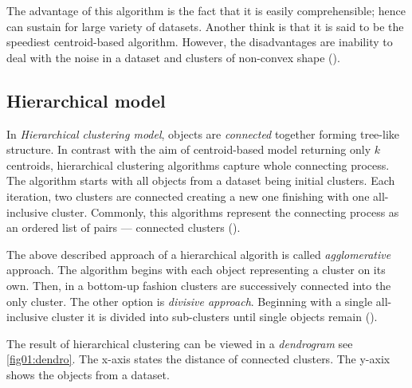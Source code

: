 The advantage of this algorithm is the fact that it is easily comprehensible; hence can sustain for large variety of datasets. Another think is that it is said to be the speediest centroid-based algorithm. However, the disadvantages are inability to deal with the noise in a dataset and clusters of non-convex shape (\cite{uppada2014centroid}).
  

\subsection{Hierarchical model}

In \emph{Hierarchical clustering model}, objects are \emph{connected} together forming tree-like structure. In contrast with the aim of centroid-based model returning only $k$ centroids, hierarchical clustering algorithms capture whole connecting process. The algorithm starts with all objects from a dataset being initial clusters. Each iteration, two clusters are connected creating a new one finishing with one all-inclusive cluster. Commonly, this algorithms represent the connecting process as an ordered list of pairs --- connected clusters (\cite{karypis1999chameleon}).

The above described approach of a hierarchical algorith is called \emph{agglomerative} approach. The algorithm begins with each object representing a cluster on its own. Then, in a bottom-up fashion clusters are successively connected into the only cluster. The other option is \emph{divisive approach}. Beginning with a single all-inclusive cluster it is divided into sub-clusters until single objects remain (\cite{rokach2005clustering}). 

The result of hierarchical clustering can be viewed in a \emph{dendrogram} see \ref{fig01:dendro}. The x-axis states the distance of connected clusters. The y-axix shows the objects from a dataset.

